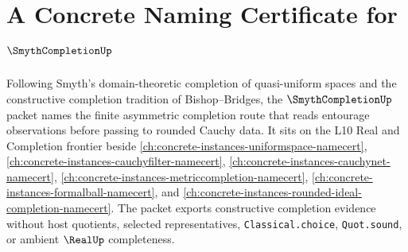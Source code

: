 \chapter{A Concrete Naming Certificate for $\SmythCompletionUp$}
\label{ch:concrete-instances-smyth-completion-namecert}

Following Smyth's domain-theoretic completion of quasi-uniform spaces and the constructive completion tradition of Bishop--Bridges, the $\SmythCompletionUp$ packet names the finite asymmetric completion route that reads entourage observations before passing to rounded Cauchy data. It sits on the L10 Real and Completion frontier beside \autoref{ch:concrete-instances-uniformspace-namecert}, \autoref{ch:concrete-instances-cauchyfilter-namecert}, \autoref{ch:concrete-instances-cauchynet-namecert}, \autoref{ch:concrete-instances-metriccompletion-namecert}, \autoref{ch:concrete-instances-formalball-namecert}, and \autoref{ch:concrete-instances-rounded-ideal-completion-namecert}. The packet exports constructive completion evidence without host quotients, selected representatives, \texttt{Classical.choice}, \texttt{Quot.sound}, or ambient $\RealUp$ completeness.


